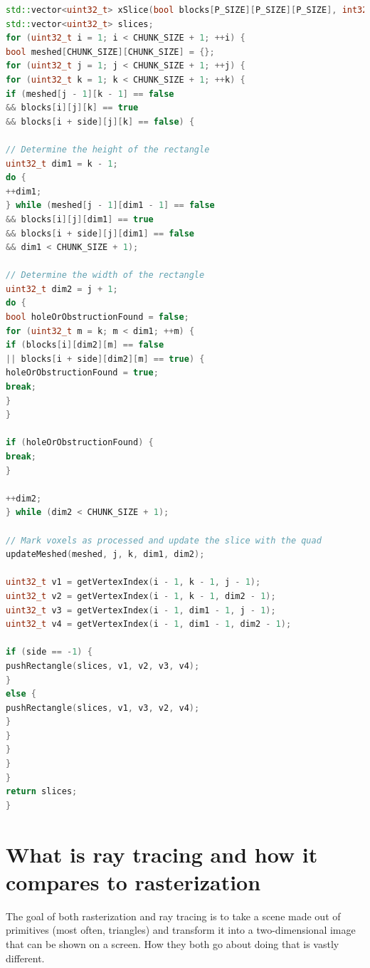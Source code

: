 \documentclass[times, utf8, zavrsni, numeric]{fer}
\begin{document}
\begin{lstlisting}[language=c++, style=cppstyle, caption="Code for handling chunk slices parallel to the YZ plane", frame=single]
std::vector<uint32_t> xSlice(bool blocks[P_SIZE][P_SIZE][P_SIZE], int32_t side) {
std::vector<uint32_t> slices;
for (uint32_t i = 1; i < CHUNK_SIZE + 1; ++i) {
bool meshed[CHUNK_SIZE][CHUNK_SIZE] = {};
for (uint32_t j = 1; j < CHUNK_SIZE + 1; ++j) {
for (uint32_t k = 1; k < CHUNK_SIZE + 1; ++k) {
if (meshed[j - 1][k - 1] == false
&& blocks[i][j][k] == true
&& blocks[i + side][j][k] == false) {

// Determine the height of the rectangle
uint32_t dim1 = k - 1;
do {
++dim1;
} while (meshed[j - 1][dim1 - 1] == false
&& blocks[i][j][dim1] == true
&& blocks[i + side][j][dim1] == false
&& dim1 < CHUNK_SIZE + 1);

// Determine the width of the rectangle
uint32_t dim2 = j + 1;
do {
bool holeOrObstructionFound = false;
for (uint32_t m = k; m < dim1; ++m) {
if (blocks[i][dim2][m] == false
|| blocks[i + side][dim2][m] == true) {
holeOrObstructionFound = true;
break;
}
}

if (holeOrObstructionFound) {
break;
}

++dim2;
} while (dim2 < CHUNK_SIZE + 1);

// Mark voxels as processed and update the slice with the quad
updateMeshed(meshed, j, k, dim1, dim2);

uint32_t v1 = getVertexIndex(i - 1, k - 1, j - 1);
uint32_t v2 = getVertexIndex(i - 1, k - 1, dim2 - 1);
uint32_t v3 = getVertexIndex(i - 1, dim1 - 1, j - 1);
uint32_t v4 = getVertexIndex(i - 1, dim1 - 1, dim2 - 1);

if (side == -1) {
pushRectangle(slices, v1, v2, v3, v4);
}
else {
pushRectangle(slices, v1, v3, v2, v4);
}
}
}
}
}
return slices;
}
\end{lstlisting}

\chapter{What is ray tracing and how it compares to rasterization}
The goal of both rasterization and ray tracing is to take a scene made out of primitives (most often, triangles) and transform it into a two-dimensional image that can be shown on a screen. How they both go about doing that is vastly different.
\end{document}
